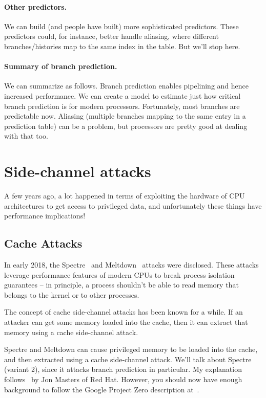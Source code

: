 \paragraph{Other predictors.} We can build (and people have built) more sophisticated predictors.
These predictors could, for instance, better handle aliasing, where
different branches/histories map to the same index in the table. But we'll stop here.

\paragraph{Summary of branch prediction.} We can summarize as follows.
Branch prediction enables pipelining and hence increased performance.
We can create a model to estimate just how critical branch prediction
is for modern processors. Fortunately, most branches are predictable
now. Aliasing (multiple branches mapping to the same entry in a
prediction table) can be a problem, but processors are pretty good at
dealing with that too.

\section*{Side-channel attacks}
A few years ago, a lot happened in terms of exploiting the hardware of CPU architectures to get access to privileged data, and unfortunately these things have performance implications!

\subsection*{Cache Attacks}
In early 2018, the Spectre~\cite{Kocher2018spectre} and Meltdown~\cite{Lipp2018meltdown} attacks were disclosed. These attacks leverage performance features of modern CPUs to break process isolation guarantees -- in principle, a process shouldn't be able to read memory that belongs to the kernel or to other processes.

The concept of cache side-channel attacks has been known for a while. If an attacker can get some memory loaded into the cache, then it can extract that memory using a cache side-channel attack.

Spectre and Meltdown can cause privileged memory to be loaded into the cache, and then extracted using a cache side-channel attack. We'll talk about Spectre (variant 2), since it attacks branch prediction in particular. My explanation follows~\cite{masters18:_what_meltd_spect} by Jon Masters of Red Hat. However, you should now have enough background to follow the Google Project Zero description at~\cite{horn18:_readin}.

